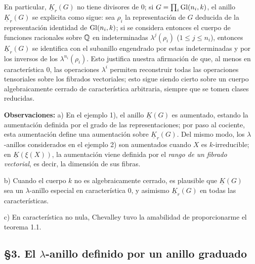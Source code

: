 En particular, $\underline{K}_r(G)$ no tiene divisores de $0$; si $G=\prod_i\operatorname{Gl}(n_i,k)$, el anillo $\underline{K}_r(G)$ se explicita como sigue: sea $\rho_i$ la representación de $G$ deducida de la representación identidad de $\operatorname{Gl}(n_i,k)$; si se considera entonces el cuerpo de funciones racionales sobre $\mathbb Q$ en indeterminadas $\lambda^j(\rho_i)$ ($1\leq j\leq n_i$), entonces $\underline{K}_r(G)$ se identifica con el subanillo engendrado por estas indeterminadas y por los inversos de los $\lambda^{n_i}(\rho_i)$. Esto justifica nuestra afirmación de que, al menos en característica $0$, las operaciones $\lambda^i$ permiten reconstruir todas las operaciones tensoriales sobre los fibrados vectoriales; esto sigue siendo cierto sobre un cuerpo algebraicamente cerrado de característica arbitraria, siempre que se tomen clases reducidas.

\textbf{Observaciones:} a) En el ejemplo 1), el anillo $\underline{K}(G)$ es aumentado, estando la aumentación definida por el grado de las representaciones; por paso al cociente, esta aumentación define una aumentación sobre $\underline{K}_r(G)$. Del mismo modo, los $\lambda$-anillos considerados en el ejemplo 2) son aumentados cuando $X$ es $k$-irreducible; en $\underline{K}(\xi(X))$, la aumentación viene definida por el \emph{rango de un fibrado vectorial}, es decir, la dimensión de sus fibras.

b) Cuando el cuerpo $k$ no es algebraicamente cerrado, es plausible que $\underline{K}(G)$ sea un $\lambda$-anillo especial en característica $0$, y asimismo $\underline{K}_r(G)$ en todas las características.

c) En característica no nula, Chevalley tuvo la amabilidad de proporcionarme el teorema 1.1.

\subsection*{\S 3. El $\lambda$-anillo definido por un anillo graduado}

